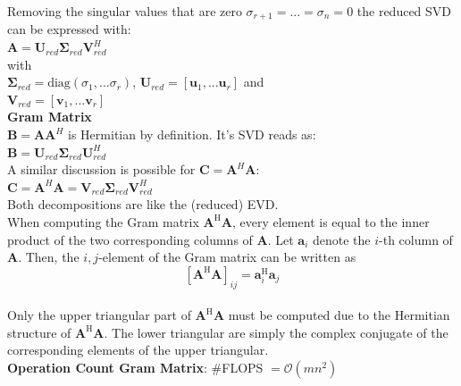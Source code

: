 \documentclass[english]{latex4ei/latex4ei_sheet}
\begin{document}
\begin{sectionbox}
    Removing the singular values that are zero $\sigma_{r+1}=...=\sigma_{n}=0$ the reduced SVD can be expressed with:\\

    $\mathbf{A} = \mathbf{U}_{red}\mathbf{\Sigma}_{red}\mathbf{V}^H_{red}$\\
    with\\
    $\mathbf{\Sigma}_{red} = \text{diag}(\sigma_1, ...\sigma_r)$,
    $\mathbf{U}_{red} = [\mathbf{u}_1, ...\mathbf{u}_r]$ and\\
    $\mathbf{V}_{red} = [\mathbf{v}_1, ...\mathbf{v}_r]$\\

    \textbf{Gram Matrix}\\

    $\mathbf{B} = \mathbf{A}\mathbf{A}^H$ is Hermitian by definition. It's SVD reads as:\\

    $\mathbf{B} = \mathbf{U}_{red}\mathbf{\Sigma}_{red}\mathbf{U}_{red}^H$\\
    A similar discussion is possible for $\mathbf{C} = \mathbf{A}^H\mathbf{A}$:\\

    $\mathbf{C}=\mathbf{A}^H\mathbf{A} = \mathbf{V}_{red}\mathbf{\Sigma}_{red}\mathbf{V}^H_{red}$\\

    Both decompositions are like the (reduced) EVD.\\
    When computing the Gram matrix $\mathbf{A}^\text{H}\mathbf{A}$, every element is equal to the inner product of the two corresponding columns of $\mathbf{A}$. Let $\mathbf{a}_i$ denote the $i$-th column of $\mathbf{A}$. Then, the $i,j$-element of the Gram matrix can be written as
    $$[\mathbf{A}^\text{H}\mathbf{A}]_{ij} = \mathbf{a}_i^\text{H}\mathbf{a}_j$$\\
    Only the upper triangular part of $\mathbf{A}^\text{H}\mathbf{A}$ must be computed due to the Hermitian structure of $\mathbf{A}^\text{H}\mathbf{A}$. The lower triangular are simply the complex conjugate of the corresponding elements of the upper triangular.\\
    \textbf{Operation Count Gram Matrix}: \#FLOPS $=\mathcal{O}(mn^2)$
\end{sectionbox}
\end{document}
